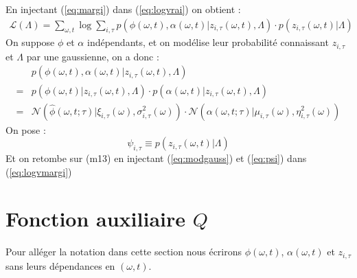 \documentclass[a4paper,12pt]{article}
\begin{document}
En injectant (\ref{eq:margi}) dans (\ref{eq:logvrai}) on obtient :
\begin{align}
 \mathcal{L}(\Lambda) = \displaystyle\sum_{\omega,t} \log \displaystyle\sum_{i, \tau} p(\phi(\omega,t), \alpha(\omega,t) | z_{i, \tau}(\omega,t), \Lambda) \cdot p(z_{i, \tau}(\omega,t) | \Lambda) \label{eq:logvmargi}
\end{align}
On suppose $\phi$ et $\alpha$ indépendants, et on modélise leur probabilité connaissant $z_{i,\tau}$ et $\Lambda$ par une gaussienne, on a donc :
\begin{align}
& p(\phi(\omega,t), \alpha(\omega,t) | z_{i, \tau}(\omega,t), \Lambda) \nonumber\\
= & p(\phi(\omega,t) | z_{i, \tau}(\omega,t), \Lambda) \cdot p(\alpha(\omega,t) | z_{i, \tau}(\omega,t), \Lambda) \nonumber\\
= & \mathcal{N}(\hat{\phi}(\omega,t;\tau) | \xi_{i,\tau}(\omega),\sigma^{2}_{i,\tau}(\omega)) \cdot \mathcal{N}(\alpha(\omega,t;\tau) | \mu_{i,\tau}(\omega),\eta^{2}_{i,\tau}(\omega)) \label{eq:modgauss}
\end{align}
On pose :
\begin{equation}
\psi_{i,\tau} \equiv  p(z_{i, \tau}(\omega,t) | \Lambda) \label{eq:psi}
\end{equation}
Et on retombe sur (m13) en injectant (\ref{eq:modgauss}) et (\ref{eq:psi}) dans (\ref{eq:logvmargi})


\section{Fonction auxiliaire $Q$}

Pour alléger la notation dans cette section nous écrirons $\phi(\omega,t)$, $\alpha(\omega,t)$ et $z_{i, \tau}$ sans leurs dépendances en $(\omega,t)$.
\end{document}
